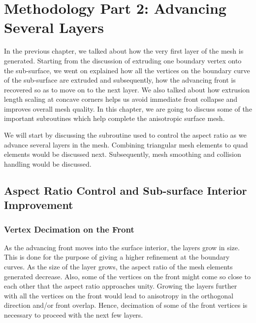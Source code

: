 \chapter{Methodology Part 2: Advancing Several Layers}

In the previous chapter, we talked about how the very first layer of the mesh is generated. Starting from the discussion of extruding one boundary vertex onto the sub-surface, we went on explained how all the vertices on the boundary curve of the sub-surface are extruded and subsequently, how the advancing front is recovered so as to move on to the next layer. We also talked about how extrusion length scaling at concave corners helps us avoid immediate front collapse and improves overall mesh quality. In this chapter, we are going to discuss some of the important subroutines which help complete the anisotropic surface mesh.

We will start by discussing the subroutine used to control the aspect ratio as we advance several layers in the mesh. Combining triangular mesh elements to quad elements would be discussed next. Subsequently, mesh smoothing and collision handling would be discussed.

\section{Aspect Ratio Control and Sub-surface Interior Improvement}

\subsection{Vertex Decimation on the Front}
\label{aspectRatioControl}

As the advancing front moves into the surface interior, the layers grow in size. This is done for the purpose of giving a higher refinement at the boundary curves. As the size of the layer grows, the aspect ratio of the mesh elements generated decrease. Also, some of the vertices on the front might come so close to each other that the aspect ratio approaches unity. Growing the layers further with all the vertices on the front would lead to anisotropy in the orthogonal direction  and/or front overlap. Hence, decimation of some of the front vertices is necessary to proceed with the next few layers.

